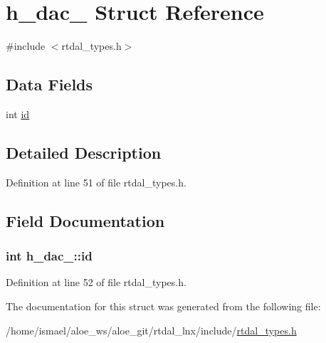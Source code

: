 \hypertarget{structh__dac__}{\section{h\-\_\-dac\-\_\- Struct Reference}
\label{structh__dac__}
}


{\ttfamily \#include $<$rtdal\-\_\-types.\-h$>$}

\subsection*{Data Fields}
\begin{DoxyCompactItemize}
\item 
int \hyperlink{structh__dac___aeaca55d5cad93c3ca5b3f9d94d188a1d}{id}
\end{DoxyCompactItemize}


\subsection{Detailed Description}


Definition at line 51 of file rtdal\-\_\-types.\-h.



\subsection{Field Documentation}
\hypertarget{structh__dac___aeaca55d5cad93c3ca5b3f9d94d188a1d}{
\subsubsection[{id}]{\setlength{\rightskip}{0pt plus 5cm}int h\-\_\-dac\-\_\-\-::id}}\label{structh__dac___aeaca55d5cad93c3ca5b3f9d94d188a1d}


Definition at line 52 of file rtdal\-\_\-types.\-h.



The documentation for this struct was generated from the following file\-:\begin{DoxyCompactItemize}
\item 
/home/ismael/aloe\-\_\-ws/aloe\-\_\-git/rtdal\-\_\-lnx/include/\hyperlink{rtdal__types_8h}{rtdal\-\_\-types.\-h}\end{DoxyCompactItemize}
